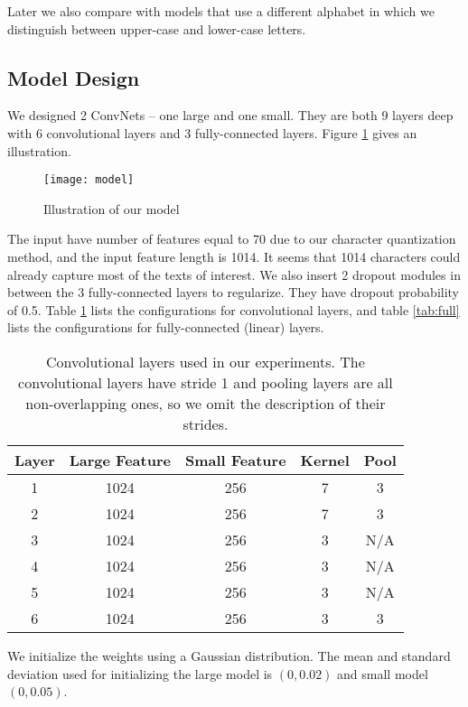 \documentclass{article} \usepackage{nips15submit_e,times}
\begin{document}
Later we also compare with models that use a different alphabet in which we distinguish between upper-case and lower-case letters.

\subsection{Model Design}

We designed 2 ConvNets -- one large and one small. They are both 9 layers deep with 6 convolutional layers and 3 fully-connected layers. Figure \ref{fig:modl} gives an illustration.

\begin{figure}[ht]
  \centering
  \texttt{[image: model]}
  \caption{Illustration of our model}
  \label{fig:modl}
\end{figure}

The input have number of features equal to 70 due to our character quantization method, and the input feature length is 1014. It seems that 1014 characters could already capture most of the texts of interest. We also insert 2 dropout\cite{HSKSS12} modules in between the 3 fully-connected layers to regularize. They have dropout probability of 0.5. Table \ref{tab:conv} lists the configurations for convolutional layers, and table \ref{tab:full} lists the configurations for fully-connected (linear) layers.

\begin{table}[ht]
  \caption{Convolutional layers used in our experiments. The convolutional layers have stride 1 and pooling layers are all non-overlapping ones, so we omit the description of their strides.}
  \label{tab:conv}
  \begin{center}
    \begin{tabular}{ccccc}
      Layer & Large Feature & Small Feature & Kernel & Pool \\
      \hline
      1 & 1024 & 256 & 7 & 3 \\
      2 & 1024 & 256 & 7 & 3 \\
      3 & 1024 & 256 & 3 & N/A \\
      4 & 1024 & 256 & 3 & N/A \\
      5 & 1024 & 256 & 3 & N/A \\
      6 & 1024 & 256 & 3 & 3 \\
    \end{tabular}
  \end{center}
\end{table}

We initialize the weights using a Gaussian distribution. The mean and standard deviation used for initializing the large model is \((0, 0.02)\) and small model \((0, 0.05)\).
\end{document}
